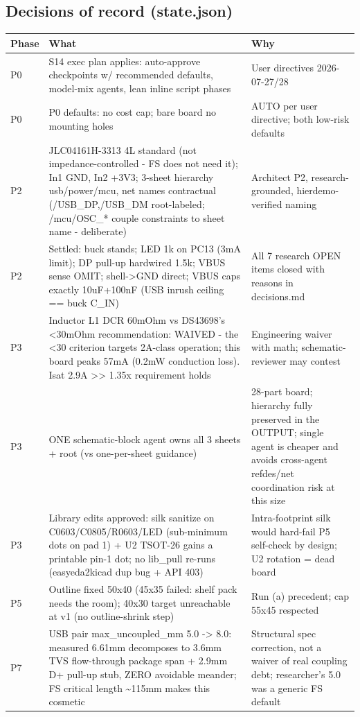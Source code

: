 \documentclass[11pt,a4paper]{article}
\begin{document}
\subsection*{Decisions of record (state.json)}
{\small
\begin{longtable}{lp{5.2cm}p{7.2cm}}
\toprule
\textbf{Phase} & \textbf{What} & \textbf{Why} \\
\midrule
\endhead
P0 & S14 exec plan applies: auto-approve checkpoints w/ recommended defaults, model-mix agents, lean inline script phases & User directives 2026-07-27/28 \\
P0 & P0 defaults: no cost cap; bare board no mounting holes & AUTO per user directive; both low-risk defaults \\
P2 & JLC04161H-3313 4L standard (not impedance-controlled - FS does not need it); In1 GND, In2 +3V3; 3-sheet hierarchy usb/power/mcu, net names contractual (/USB\_DP,/USB\_DM root-labeled; /mcu/OSC\_{*} couple constraints to sheet name - deliberate) & Architect P2, research-grounded, hierdemo-verified naming \\
P2 & Settled: buck stands; LED 1k on PC13 (3mA limit); DP pull-up hardwired 1.5k; VBUS sense OMIT; shell-\textgreater{}GND direct; VBUS caps exactly 10uF+100nF (USB inrush ceiling == buck C\_IN) & All 7 research OPEN items closed with reasons in decisions.md \\
P3 & Inductor L1 DCR 60mOhm vs DS43698's \textless{}30mOhm recommendation: WAIVED - the \textless{}30 criterion targets 2A-class operation; this board peaks 57mA (0.2mW conduction loss). Isat 2.9A \textgreater{}\textgreater{} 1.35x requirement holds & Engineering waiver with math; schematic-reviewer may contest \\
P3 & ONE schematic-block agent owns all 3 sheets + root (vs one-per-sheet guidance) & 28-part board; hierarchy fully preserved in the OUTPUT; single agent is cheaper and avoids cross-agent refdes/net coordination risk at this size \\
P3 & Library edits approved: silk sanitize on C0603/C0805/R0603/LED (sub-minimum dots on pad 1) + U2 TSOT-26 gains a printable pin-1 dot; no lib\_pull re-runs (easyeda2kicad dup bug + API 403) & Intra-footprint silk would hard-fail P5 self-check by design; U2 rotation = dead board \\
P5 & Outline fixed 50x40 (45x35 failed: shelf pack needs the room); 40x30 target unreachable at v1 (no outline-shrink step) & Run (a) precedent; cap 55x45 respected \\
P7 & USB pair max\_uncoupled\_mm 5.0 -\textgreater{} 8.0: measured 6.61mm decomposes to 3.6mm TVS flow-through package span + 2.9mm D+ pull-up stub, ZERO avoidable meander; FS critical length \textasciitilde{}115mm makes this cosmetic & Structural spec correction, not a waiver of real coupling debt; researcher's 5.0 was a generic FS default \\
\bottomrule
\end{longtable}
}
\end{document}
